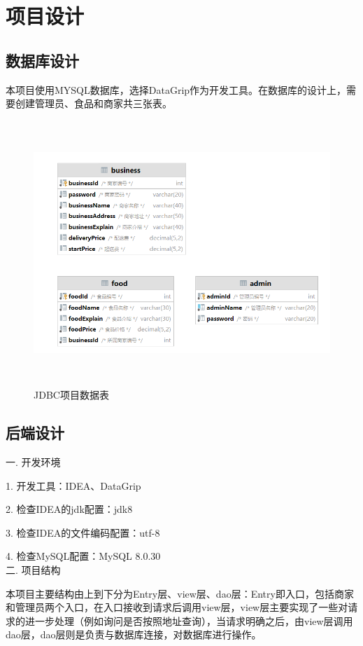 \section{项目设计}
\subsection{数据库设计}
本项目使用MYSQL数据库，选择DataGrip作为开发工具。在数据库的设计上，需要创建管理员、食品和商家共三张表。

\begin{figure}[H]
    \centering
    \includegraphics[width=15cm,height=10cm]{figures/table1.png}
    \caption{JDBC项目数据表}
\end{figure}

\subsection{后端设计}

\noindent
一. 开发环境

1. 开发工具：IDEA、DataGrip

2. 检查IDEA的jdk配置：jdk8


3. 检查IDEA的文件编码配置：utf-8

4. 检查MySQL配置：MySQL 8.0.30~\\


\noindent
二. 项目结构

本项目主要结构由上到下分为Entry层、view层、dao层：Entry即入口，包括商家和管理员两个入口，在入口接收到请求后调用view层，view层主要实现了一些对请求的进一步处理（例如询问是否按照地址查询），当请求明确之后，由view层调用dao层，dao层则是负责与数据库连接，对数据库进行操作。

